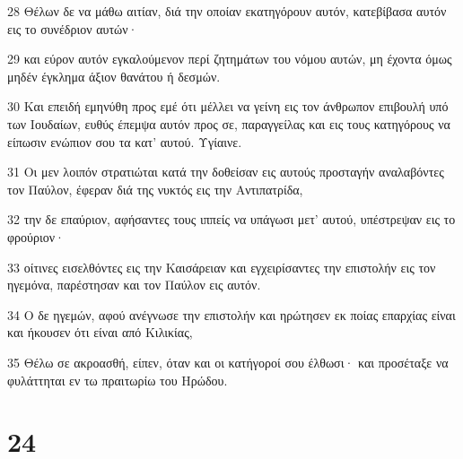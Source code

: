 \par 28 Θέλων δε να μάθω αιτίαν, διά την οποίαν εκατηγόρουν αυτόν, κατεβίβασα αυτόν εις το συνέδριον αυτών·
\par 29 και εύρον αυτόν εγκαλούμενον περί ζητημάτων του νόμου αυτών, μη έχοντα όμως μηδέν έγκλημα άξιον θανάτου ή δεσμών.
\par 30 Και επειδή εμηνύθη προς εμέ ότι μέλλει να γείνη εις τον άνθρωπον επιβουλή υπό των Ιουδαίων, ευθύς έπεμψα αυτόν προς σε, παραγγείλας και εις τους κατηγόρους να είπωσιν ενώπιον σου τα κατ' αυτού. Υγίαινε.
\par 31 Οι μεν λοιπόν στρατιώται κατά την δοθείσαν εις αυτούς προσταγήν αναλαβόντες τον Παύλον, έφεραν διά της νυκτός εις την Αντιπατρίδα,
\par 32 την δε επαύριον, αφήσαντες τους ιππείς να υπάγωσι μετ' αυτού, υπέστρεψαν εις το φρούριον·
\par 33 οίτινες εισελθόντες εις την Καισάρειαν και εγχειρίσαντες την επιστολήν εις τον ηγεμόνα, παρέστησαν και τον Παύλον εις αυτόν.
\par 34 Ο δε ηγεμών, αφού ανέγνωσε την επιστολήν και ηρώτησεν εκ ποίας επαρχίας είναι και ήκουσεν ότι είναι από Κιλικίας,
\par 35 Θέλω σε ακροασθή, είπεν, όταν και οι κατήγοροί σου έλθωσι· και προσέταξε να φυλάττηται εν τω πραιτωρίω του Ηρώδου.

\chapter{24}

